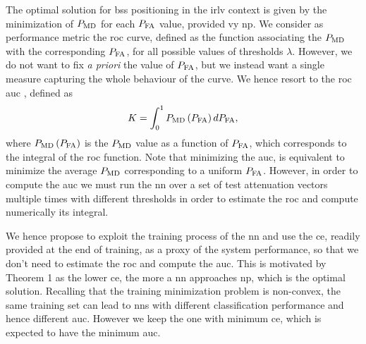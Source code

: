 \documentclass[conference,draftcls,onecolumn]{IEEEtran}
\begin{document}
The optimal solution for \acp{bs} positioning in the \ac{irlv} context is given by the minimization of $P_{\rm MD}$ for each $P_{\rm FA}$ value, provided vy \ac{np}. We consider as performance metric the \ac{roc} curve, defined as the  function associating the $P_{\rm MD}$ with the corresponding $P_{\rm FA}$, for all possible values of thresholds $\lambda$. However, we do not want to fix {\em a priori} the value of $P_{\rm FA}$, but we instead want a single measure capturing the whole behaviour of the curve. We hence resort to the \ac{roc} \ac{auc} \cite{hanley-82}, defined as 
\begin{equation}
    K  = \int_{0}^{1} P_{\rm MD}\left(P_{\rm FA}\right) d P_{\rm FA},
\end{equation}
where $P_{\rm MD}\left(P_{\rm FA}\right)$ is the $P_{\rm MD}$ value as a function of $P_{\rm FA}$, which corresponds to the integral of the \ac{roc} function. Note that minimizing the \ac{auc}, is equivalent to minimize the average $P_{\rm MD}$ corresponding to a uniform $P_{\rm FA}$.
However, in order to compute the \ac{auc} we must run the \ac{nn} over a set of test attenuation vectors multiple times with different thresholds in order to estimate the \ac{roc} and compute numerically its integral.

We hence propose to exploit the training process of the \ac{nn} and use the \ac{ce}, readily provided at the end of training, as a proxy of the system performance, so that we don't need to estimate the \ac{roc} and compute the \ac{auc}. This is motivated by Theorem 1 as the lower \ac{ce}, the more a \ac{nn} approaches \ac{np}, which is the optimal solution. 
Recalling that the training minimization problem is non-convex, the same training set can lead to \acp{nn} with different classification performance and hence different \ac{auc}. However we keep the one with minimum \ac{ce}, which is expected to have the minimum \ac{auc}.
\end{document}
